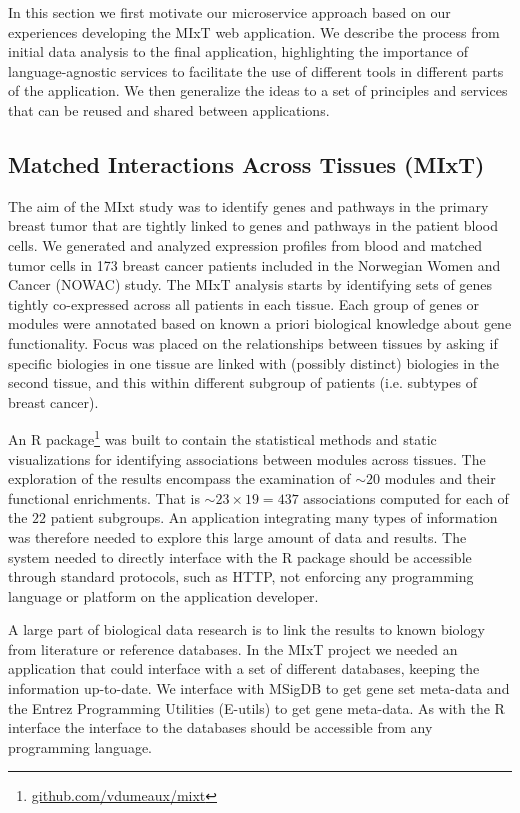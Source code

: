 In this section we first motivate our microservice approach based on our
experiences developing the MIxT web application.
We describe the process from initial data analysis to the final application,
highlighting the importance
of language-agnostic services to facilitate the use of different tools in
different parts of the application. 
We then generalize the ideas to a set
of principles and services that can be reused and shared between applications. 

\subsection*{Matched Interactions Across Tissues (MIxT)} 
The aim of the MIxt study was to identify genes and pathways in the primary
breast tumor that are tightly linked to genes and pathways in the patient blood
cells. We generated and analyzed expression profiles from blood and matched
tumor cells in 173 breast cancer patients included in the Norwegian Women and
Cancer (NOWAC) study.\cite{vanessa}
The MIxT analysis starts by identifying sets of genes tightly co-expressed
across all patients in each tissue. Each group of genes or modules were
annotated based on known a priori biological knowledge about gene functionality.
Focus was placed on the relationships between tissues by asking if specific
biologies in one tissue are linked with (possibly distinct) biologies in the
second tissue, and this within different subgroup of patients (i.e. subtypes of
breast cancer).

An R package\footnote{\url{github.com/vdumeaux/mixt}} was built to contain the
statistical methods and static visualizations for identifying associations
between modules across tissues. The exploration of the results encompass the
examination  of $\sim20$ modules and their functional enrichments.  That is
$\sim23\times19=437$ associations computed for each of the $22$ patient
subgroups. 
An application integrating many types of information was therefore needed to
explore this large amount of data and results.
The system needed to directly interface with the R package should be accessible
through standard protocols, such as HTTP, not enforcing any programming language
or platform on the application developer. 

A large part of biological data research is to link the results to known biology
from literature or reference databases. In the MIxT project we needed an
application that could interface with a set of different databases, keeping the
information up-to-date. We interface with MSigDB to get gene set meta-data and
the Entrez Programming Utilities (E-utils) to get gene meta-data. 
As with the R interface the interface to the databases
should be accessible from any programming language. 

